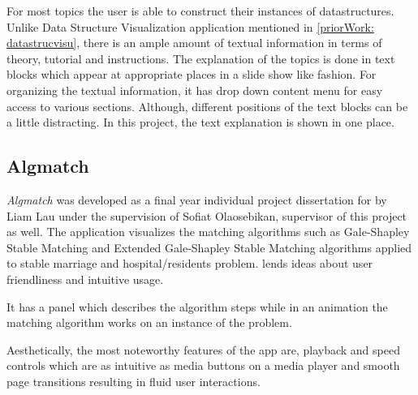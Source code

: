 For most topics the user is able to construct their instances of datastructures.
Unlike Data Structure Visualization application mentioned in
\autoref{priorWork: datastrucvisu}, there is an ample amount of textual
information in terms of theory, tutorial and instructions. The explanation of
the topics is done in text blocks which appear at appropriate places in a slide
show like fashion. For organizing the textual information, it has drop down
content menu for easy access to various sections. Although, different positions
of the text blocks can be a little distracting. In this project, the text explanation
is shown in one place.


\subsection{Algmatch}
\label{priorWork: algmatch}
\emph{Algmatch} was developed as a final year individual project dissertation for
by Liam Lau under the supervision of Sofiat Olaosebikan, supervisor of this project as well. The application
visualizes the matching algorithms such as Gale-Shapley Stable Matching and
Extended Gale-Shapley Stable Matching algorithms applied to stable marriage and
hospital/residents problem. \cite{LiamApp}
lends ideas about user friendliness and intuitive usage.

It has a panel which describes the algorithm steps while in an animation the
matching algorithm works on an instance of the problem.

Aesthetically, the most noteworthy features of the app are, playback and speed
controls which are as intuitive as media buttons on a media player and smooth
page transitions resulting in fluid user interactions.
